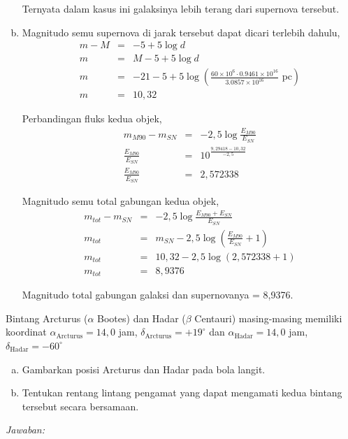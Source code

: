 \documentclass[11pt,fleqn]{exam}
\begin{document}
\begin{questions}
\begin{enumerate}[(a)]
\begin{itemize}
\end{itemize}
Ternyata dalam kasus ini galaksinya lebih terang dari supernova tersebut.

\item Magnitudo semu supernova di jarak tersebut dapat dicari terlebih dahulu,
\begin{eqnarray*}
m - M &=& -5 + 5 \log{d}\\
m &=& M -5 +5\log{d}\\
m &=& -21 - 5 + 5 \log{\left(\frac{60 \times 10^6 \cdot 0.9461\times 10^{16}}{3.0857 \times 10^{16}} \text{ pc} \right)}\\
m &=& 10,32
\end{eqnarray*}

Perbandingan fluks kedua objek,
\begin{eqnarray*}
m_{M90} - m_{SN} &=& -2,5 \log{\frac{E_{M90}}{E_{SN}}}\\
\frac{E_{M90}}{E_{SN}} &=& 10^{\frac{9,29418 - 10,32}{-2,5}}\\
\frac{E_{M90}}{E_{SN}} &=& 2,572338
\end{eqnarray*}

Magnitudo semu total gabungan kedua objek,
\begin{eqnarray*}
m_{tot} - m_{SN} &=& -2,5 \log{\frac{E_{M90} + E_{SN}}{E_{SN}}}\\
m_{tot} &=& m_{SN} -2,5 \log{\left(\frac{E_{M90}}{E_{SN}} + 1 \right)}\\
m_{tot} &=& 10,32 -2,5 \log{(2,572338 + 1)}\\
m_{tot} &=& 8,9376
\end{eqnarray*}

Magnitudo total gabungan galaksi dan supernovanya = 8,9376.

\end{enumerate}


\question Bintang Arcturus ($\alpha$ Bootes) dan Hadar ($\beta$ Centauri) masing-masing memiliki koordinat $\alpha_{\text{Arcturus}}=14,0$ jam, $\delta_{\text{Arcturus}}=+19^{\circ}$ dan $\alpha_{\text{Hadar}}=14,0$ jam, $\delta_{\text{Hadar}}=-60^{\circ}$
\begin{enumerate}[(a)]
\item Gambarkan posisi Arcturus dan Hadar pada bola langit.
\item Tentukan rentang lintang pengamat yang dapat mengamati kedua bintang tersebut secara bersamaan.
\end{enumerate}

\textit{Jawaban: }


\end{questions}
\end{document}
